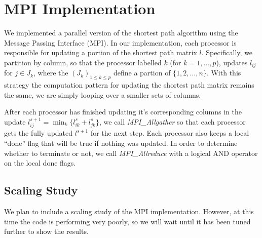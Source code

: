 \documentclass[11pt]{article}
\begin{document}
\section*{MPI Implementation}

We implemented a parallel version of the shortest path algorithm using the
Message Passing Interface (MPI).
In our implementation, each processor is responsible for updating a portion of 
the shortest path matrix $l$.  Specifically, we partition by column, so that 
the processor labelled $k$ (for $k = 1, \ldots, p$), updates $l_{ij}$ for 
$j \in J_k$, where the $(J_k)_{1 \leq k \leq p}$ define a partion of 
$\{1, 2, \ldots, n\}$.
With this strategy the computation pattern for updating the shortest path matrix
remains the same, we are simply looping over a smaller sets of columns.

After each processor has finished updating it's corresponding columns in
the update $l_{ij}^{s+1} = \min_k \{ l^s_{ik} + l^s_{jk} \}$, we call
\emph{MPI\_Allgather} so that each processor gets the fully updated $l^{s+1}$
for the next step.  Each processor also keeps a local ``done'' flag that will
	be true if nothing was updated.  In order to determine whether to terminate
	or not, we call \emph{MPI\_Allreduce} with a logical AND operator on the local
	done flags.

	\subsection*{Scaling Study}

	We plan to include a scaling study of the MPI implementation.  However, at this time the 
	code is performing very poorly, so we will wait until it has been tuned further to show 
	the results.
\end{document}
